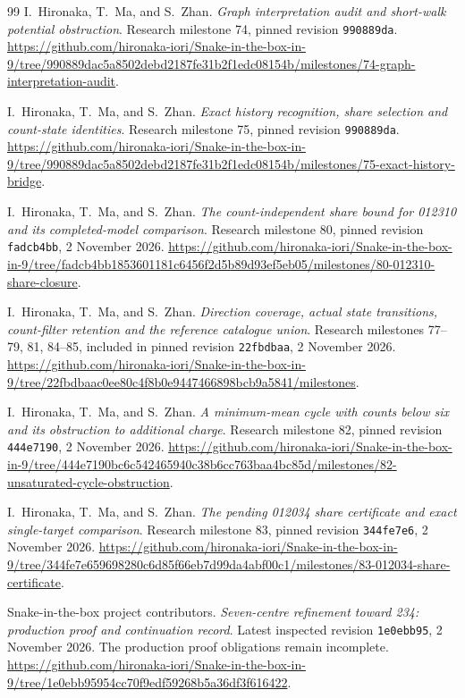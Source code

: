 \documentclass[11pt,a4paper]{article}
\theoremstyle{definition}
\theoremstyle{remark}
\begin{document}
\begin{thebibliography}{99}
I.~Hironaka, T.~Ma, and S.~Zhan. \emph{Graph interpretation audit and short-walk potential obstruction}. Research milestone 74, pinned revision \texttt{990889da}.
\url{https://github.com/hironaka-iori/Snake-in-the-box-in-9/tree/990889dac5a8502debd2187fe31b2f1edc08154b/milestones/74-graph-interpretation-audit}.

I.~Hironaka, T.~Ma, and S.~Zhan. \emph{Exact history recognition, share selection and count-state identities}. Research milestone 75, pinned revision \texttt{990889da}.
\url{https://github.com/hironaka-iori/Snake-in-the-box-in-9/tree/990889dac5a8502debd2187fe31b2f1edc08154b/milestones/75-exact-history-bridge}.

I.~Hironaka, T.~Ma, and S.~Zhan. \emph{The count-independent share bound for 012310 and its completed-model comparison}. Research milestone 80, pinned revision \texttt{fadcb4bb}, 2 November 2026.
\url{https://github.com/hironaka-iori/Snake-in-the-box-in-9/tree/fadcb4bb1853601181c6456f2d5b89d93ef5eb05/milestones/80-012310-share-closure}.

I.~Hironaka, T.~Ma, and S.~Zhan. \emph{Direction coverage, actual state transitions, count-filter retention and the reference catalogue union}. Research milestones 77--79, 81, 84--85, included in pinned revision \texttt{22fbdbaa}, 2 November 2026.
\url{https://github.com/hironaka-iori/Snake-in-the-box-in-9/tree/22fbdbaac0ee80c4f8b0e9447466898bcb9a5841/milestones}.

I.~Hironaka, T.~Ma, and S.~Zhan. \emph{A minimum-mean cycle with counts below six and its obstruction to additional charge}. Research milestone 82, pinned revision \texttt{444e7190}, 2 November 2026.
\url{https://github.com/hironaka-iori/Snake-in-the-box-in-9/tree/444e7190bc6c542465940c38b6cc763baa4bc85d/milestones/82-unsaturated-cycle-obstruction}.

I.~Hironaka, T.~Ma, and S.~Zhan. \emph{The pending 012034 share certificate and exact single-target comparison}. Research milestone 83, pinned revision \texttt{344fe7e6}, 2 November 2026.
\url{https://github.com/hironaka-iori/Snake-in-the-box-in-9/tree/344fe7e659698280c6d85f66eb7d99da4abf00c1/milestones/83-012034-share-certificate}.

Snake-in-the-box project contributors. \emph{Seven-centre refinement toward 234: production proof and continuation record}. Latest inspected revision \texttt{1e0ebb95}, 2 November 2026. The production proof obligations remain incomplete.
\url{https://github.com/hironaka-iori/Snake-in-the-box-in-9/tree/1e0ebb95954cc70f9edf59268b5a36df3f616422}.


\end{thebibliography}
\end{document}
